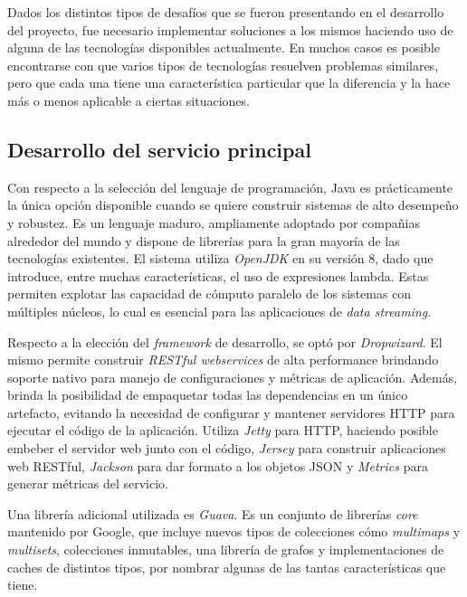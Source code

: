 \documentclass[a4paper,10pt, oneside]{article}
\begin{document}
Dados los distintos tipos de desafíos que se fueron presentando en el desarrollo del proyecto, fue necesario implementar soluciones a los mismos haciendo uso de alguna de las tecnologías disponibles actualmente. En muchos casos es posible encontrarse con que varios tipos de tecnologías resuelven problemas similares, pero que cada una tiene una característica particular que la diferencia y la hace más o menos aplicable a ciertas situaciones.

\subsection{Desarrollo del servicio principal}
Con respecto a la selección del lenguaje de programación, Java\cite{java} es prácticamente la única opción disponible cuando se quiere construir sistemas de alto desempeño y robustez. Es un lenguaje maduro, ampliamente adoptado por compañias alrededor del mundo y dispone de librerías para la gran mayoría de las tecnologías existentes. El sistema utiliza \textit{OpenJDK} en su versión 8, dado que introduce, entre muchas características, el uso de expresiones lambda. Estas permiten explotar las capacidad de cómputo paralelo de los sistemas con múltiples núcleos, lo cual es esencial para las aplicaciones de \textit{data streaming}.

Respecto a la elección del \textit{framework} de desarrollo, se optó por \textit{Dropwizard}\cite{dropwizard}. El mismo permite construir \textit{RESTful webservices} de alta performance brindando soporte nativo para manejo de configuraciones y métricas de aplicación. Además, brinda la posibilidad de empaquetar todas las dependencias en un único artefacto, evitando la necesidad de configurar y mantener servidores HTTP para ejecutar el código de la aplicación. Utiliza \textit{Jetty}\cite{jetty} para HTTP, haciendo posible embeber el servidor web junto con el código, \textit{Jersey}\cite{jersey} para construir aplicaciones web RESTful, \textit{Jackson}\cite{jackson} para dar formato a los objetos JSON y \textit{Metrics}\cite{metrics} para generar métricas del servicio.

Una librería adicional utilizada es \textit{Guava}\cite{guava}. Es un conjunto de librerías \textit{core} mantenido por Google, que incluye nuevos tipos de colecciones cómo \textit{multimaps} y \textit{multisets}, colecciones inmutables, una librería de grafos y implementaciones de caches de distintos tipos, por nombrar algunas de las tantas características que tiene.
\end{document}
